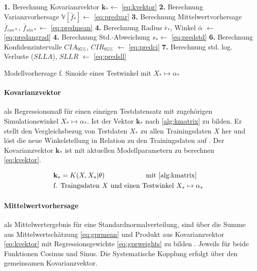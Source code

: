 \begin{algorithm}[htp]
	\SetAlgoLined
	\textbf{1.} Berechnung Kovarianzvektor $\mathbf{k}_* \leftarrow$ \autoref{eq:kvektor}\;
	\textbf{2.} Berechnung Varianzvorhersage $\mathbb{V}\left[ \bar{f}_* \right] \leftarrow$ \autoref{eq:predvar}\;
	\textbf{3.} Berechnung Mittelwertvorhersage $\bar{f}_{cos*}$, $\bar{f}_{sin*} \leftarrow$ \autoref{eq:predmean}\;
	\textbf{4.} Berechnung Radius $\bar{r}_*$, Winkel $\bar{\alpha}$ $\leftarrow$ \autoref{eq:predangrad}\;
	\textbf{4.} Berechnung Std.-Abweichung $s_* \leftarrow$ \autoref{eq:predstd}\;
	\textbf{6.} Berechnung Konfidenzintervalle $CIA_{95\%}$, $CIR_{95\%}$ $\leftarrow$ \autoref{eq:predci}\;
	\textbf{7.} Berechnung std. log. Verluste ($SLLA$), $SLLR$ $\leftarrow$ \autoref{eq:predsll}\;
	\caption{Modellvorhersage f. Sinoide eines Testwinkel mit $X_* \mapsto \alpha_*$}
	\label{alg:gprvorhersage}
\end{algorithm}


\paragraph*{Kovarianzvektor} als Regressionsmaß für einen einzigen Testdatensatz mit zugehörigen Simulationswinkel $X_* \mapsto \alpha_*$. Ist der Vektor $\mathbf{k}_*$ nach \autoref{alg:kmatrix} zu bilden. Er stellt den Vergleichsbezug von Testdaten $X_*$ zu allen Trainingsdaten $X$ her und löst die neue Winkelstellung in Relation zu den Trainingsdaten auf \cite{Rasmussen2006}. Der Kovarianzvektor $\mathbf{k}_*$ ist mit aktuellen Modellparametern zu berechnen \autoref{eq:kvektor}.

\begin{align}\label{eq:kvektor}
	& \mathbf{k}_* =  K(X, X_* | \theta) \qquad\qquad\qquad \text{mit } \text{\autoref{alg:kmatrix}} \\
	& \text{f. Traingsdaten } X \text{ und } \text{einen Testwinkel } X_* \mapsto \alpha_* \nonumber
\end{align}


\clearpage


\paragraph*{Mittelwertvorhersage} als Mittelwertergebnis für eine Standardnormalverteilung, sind über die Summe aus Mittelwertschätzung \autoref{eq:gprmean} und Produkt aus Kovarianzvektor \autoref{eq:kvektor} mit Regressionsgewichte \autoref{eq:gprweights} zu bilden \cite{Rasmussen2006}. Jeweils für beide Funktionen Cosinus und Sinus. Die Systematische Kopplung erfolgt über den gemeinsamen Kovarianzvektor.


